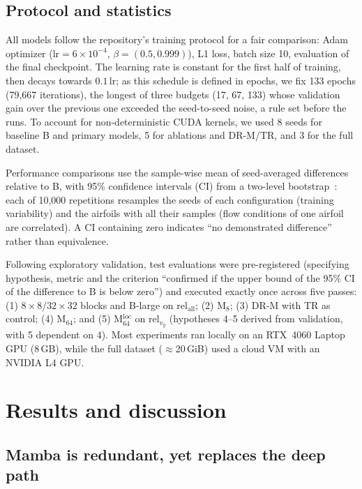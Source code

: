\documentclass[conference]{IEEEtran}
\newcommand{\B}{B}                                  %
\newcommand{\Blarge}{B-large}                       %
\newcommand{\M}[1]{M$_{#1}$}                        %
\newcommand{\Mloc}{M$^{\mathrm{loc}}_{64}$}         %
\newcommand{\DR}{DR-M}                              %
\newcommand{\TR}{TR}                                %
\newcommand{\relvy}{$\mathrm{rel}_{v_y}$}
\newcommand{\relall}{$\mathrm{rel}_{\mathrm{all}}$}
\begin{document}
\subsection{Protocol and statistics}
\label{sec:protocol}

All models follow the repository's training protocol for a fair comparison: Adam optimizer
($\text{lr}=6\times10^{-4}$, $\beta=(0.5,0.999)$), L1 loss, batch size 10,
evaluation of the final checkpoint. The learning rate is constant for the
first half of training, then decays towards $0.1\,\text{lr}$; as this schedule
is defined in epochs, we fix 133 epochs (79,667 iterations), the longest of
three budgets (17, 67, 133) whose validation gain over the previous one
exceeded the seed-to-seed noise, a rule set before the runs. To account for
non-deterministic CUDA kernels, we used 8 seeds for baseline \B{} and primary models, 5
for ablations and \DR/\TR, and 3 for the full dataset.

Performance comparisons use the sample-wise mean of seed-averaged differences relative to
\B, with 95\% confidence intervals (CI) from a two-level
bootstrap~\cite{efron1993}: each of 10,000 repetitions resamples the seeds of
each configuration (training variability) and the airfoils with all their
samples (flow conditions of one airfoil are correlated). A CI containing zero
indicates ``no demonstrated difference'' rather than equivalence.

Following exploratory validation, test evaluations were pre-registered (specifying hypothesis, metric  and the criterion ``confirmed if the upper bound of the 95\% CI
of the difference to \B{} is below zero'') and executed exactly once across five passes:
(1) $8\times8$/$32\times32$ blocks and \Blarge{} on \relall;
(2) \M{8};
(3) \DR{} with \TR{} as control;
(4) \M{64}; and
(5) \Mloc{} on \relvy{} (hypotheses 4--5 derived from validation, with 5 dependent on 4).
Most experiments ran locally on an RTX~4060 Laptop GPU (8\,GB), while the full dataset ($\approx$20\,GiB) used a cloud VM with an NVIDIA L4 GPU.

\section{Results and discussion}

\subsection{Mamba is redundant, yet replaces the deep path}
\label{sec:deep}
\end{document}
